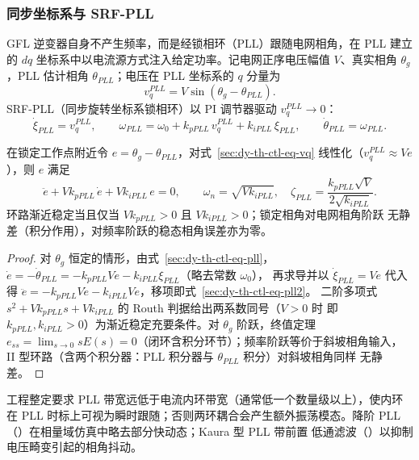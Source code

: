 \subsubsection{同步坐标系与 SRF-PLL}

GFL 逆变器自身不产生频率，而是经锁相环（PLL）跟随电网相角，在 PLL 建立的
$dq$ 坐标系中以电流源方式注入给定功率。记电网正序电压幅值 $V$、真实相角
$\theta_g$，PLL 估计相角 $\theta_{PLL}$；电压在 PLL 坐标系的 $q$ 分量为
\begin{equation}
v_q^{PLL}=V\sin(\theta_g-\theta_{PLL}).
\label{sec:dy-th-ctl-eq-vq}
\end{equation}
SRF-PLL（同步旋转坐标系锁相环）以 PI 调节器驱动 $v_q^{PLL}\to0$：
\begin{equation}
\dot\xi_{PLL}=v_q^{PLL},\qquad
\omega_{PLL}=\omega_0+k_{pPLL}\,v_q^{PLL}+k_{iPLL}\,\xi_{PLL},\qquad
\dot\theta_{PLL}=\omega_{PLL}.
\label{sec:dy-th-ctl-eq-pll}
\end{equation}

\begin{proposition}\label{sec:dy-th-ctl-prop-pll}
在锁定工作点附近令 $e=\theta_g-\theta_{PLL}$，对式~\eqref{sec:dy-th-ctl-eq-vq}
线性化（$v_q^{PLL}\approx Ve$），则 $e$ 满足
\begin{equation}
\ddot e+V k_{pPLL}\,\dot e+V k_{iPLL}\,e=0,
\qquad
\omega_n=\sqrt{V k_{iPLL}},\quad
\zeta_{PLL}=\frac{k_{pPLL}\sqrt{V}}{2\sqrt{k_{iPLL}}}.
\label{sec:dy-th-ctl-eq-pll2}
\end{equation}
环路渐近稳定当且仅当 $V k_{pPLL}>0$ 且 $V k_{iPLL}>0$；锁定相角对电网相角阶跃
无静差（积分作用），对频率阶跃的稳态相角误差亦为零。
\end{proposition}

\begin{proof}
对 $\theta_g$ 恒定的情形，由式~\eqref{sec:dy-th-ctl-eq-pll}，
$\dot e=-\dot\theta_{PLL}=-k_{pPLL}Ve-k_{iPLL}\xi_{PLL}$（略去常数 $\omega_0$），
再求导并以 $\dot\xi_{PLL}=Ve$ 代入得
$\ddot e=-k_{pPLL}V\dot e-k_{iPLL}Ve$，移项即式~\eqref{sec:dy-th-ctl-eq-pll2}。
二阶多项式 $s^2+Vk_{pPLL}s+Vk_{iPLL}$ 的 Routh 判据给出两系数同号（$V>0$ 时
即 $k_{pPLL},k_{iPLL}>0$）为渐近稳定充要条件。对 $\theta_g$ 阶跃，终值定理
$e_{ss}=\lim_{s\to0}sE(s)=0$（闭环含积分环节）；频率阶跃等价于斜坡相角输入，
II 型环路（含两个积分器：PLL 积分器与 $\theta_{PLL}$ 积分）对斜坡相角同样
无静差。
\end{proof}

\begin{remark}
工程整定要求 PLL 带宽远低于电流内环带宽（通常低一个数量级以上），使内环在
PLL 时标上可视为瞬时跟随；否则两环耦合会产生额外振荡模态。降阶 PLL
（）在相量域仿真中略去部分快动态；Kaura 型 PLL 带前置
低通滤波（）以抑制电压畸变引起的相角抖动。
\end{remark}

